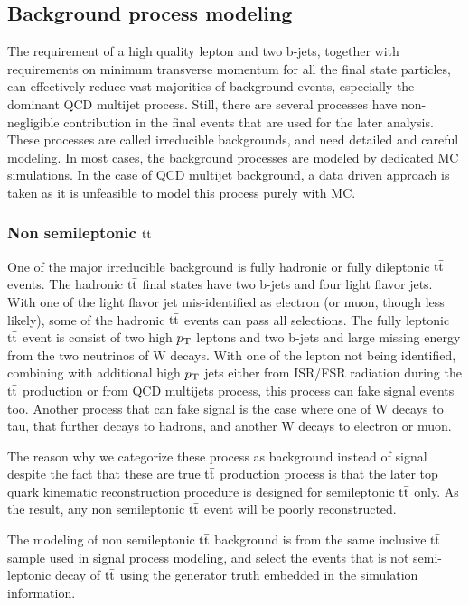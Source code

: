 \subsection{Background process modeling}
The requirement of a high quality lepton and two b-jets, together with requirements on minimum transverse momentum for all the final state particles, can effectively reduce vast majorities of background events, especially the dominant QCD multijet process. Still, there are several processes have non-negligible contribution in the final events that are used for the later analysis. These processes are called irreducible backgrounds, and need detailed and careful modeling. In most cases, the background processes are modeled by dedicated MC simulations. In the case of QCD multijet background, a data driven approach is taken as it is unfeasible to model this process purely with MC.

\subsubsection*{Non semileptonic $\mathrm{t}\bar{\mathrm{t}}$}
One of the major irreducible background is fully hadronic or fully dileptonic $\mathrm{t}\bar{\mathrm{t}}$ events. The hadronic $\mathrm{t}\bar{\mathrm{t}}$ final states have two b-jets and four light flavor jets. With one of the light flavor jet mis-identified as electron (or muon, though less likely), some of the hadronic $\mathrm{t}\bar{\mathrm{t}}$ events can pass all selections. The fully leptonic $\mathrm{t}\bar{\mathrm{t}}$ event is consist of two high $p_\mathrm{T}$ leptons and two b-jets and large missing energy from the two neutrinos of W decays. With one of the lepton not being identified, combining with additional high $p_\mathrm{T}$ jets either from ISR/FSR radiation during the $\mathrm{t}\bar{\mathrm{t}}$ production or from QCD multijets process, this process can fake signal events too. Another process that can fake signal is the case where one of W decays to tau, that further decays to hadrons, and another W decays to electron or muon. 

The reason why we categorize these process as background instead of signal despite the fact that these are true $\mathrm{t}\bar{\mathrm{t}}$ production process is that the later top quark kinematic reconstruction procedure is designed for semileptonic $\mathrm{t}\bar{\mathrm{t}}$ only. As the result, any non semileptonic $\mathrm{t}\bar{\mathrm{t}}$ event will be poorly reconstructed.

The modeling of non semileptonic $\mathrm{t}\bar{\mathrm{t}}$ background is from the same inclusive $\mathrm{t}\bar{\mathrm{t}}$ sample used in signal process modeling, and select the events that is not semi-leptonic decay of $\mathrm{t}\bar{\mathrm{t}}$ using the generator truth embedded in the simulation information.

